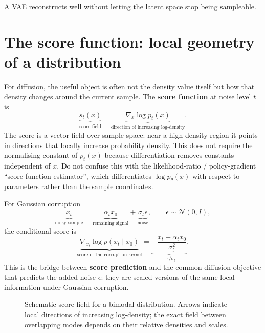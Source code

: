 \begin{calloutmemoryhook}
A VAE reconstructs well without letting the latent space stop being sampleable.
\end{calloutmemoryhook}

\section{The score function: local geometry of a distribution}

For diffusion, the useful object is often not the density value itself but how that density changes around the current sample.
The \textbf{score function} at noise level $t$ is
\[
\boxed{
\underbrace{s_t(x)}_{\text{score field}}
=
\underbrace{\nabla_x\log p_t(x)}_{\text{direction of increasing log-density}}
}.
\]
The score is a vector field over sample space: near a high-density region it points in directions that locally increase probability density.
This does not require the normalising constant of $p_t(x)$ because differentiation removes constants independent of $x$.
Do not confuse this with the likelihood-ratio / policy-gradient ``score-function estimator'', which differentiates $\log p_\theta(x)$ with respect to parameters rather than the sample coordinates.

For Gaussian corruption
\[
\underbrace{x_t}_{\text{noisy sample}}
=
\underbrace{\alpha_t x_0}_{\text{remaining signal}}
+
\underbrace{\sigma_t\epsilon}_{\text{noise}},
\qquad \epsilon\sim\mathcal N(0,I),
\]
the conditional score is
\[
\underbrace{\nabla_{x_t}\log p(x_t\mid x_0)}_{\text{score of the corruption kernel}}
=
\underbrace{-\frac{x_t-\alpha_t x_0}{\sigma_t^2}}_{-\epsilon/\sigma_t}.
\]
This is the bridge between \textbf{score prediction} and the common diffusion objective that predicts the added noise $\epsilon$: they are scaled versions of the same local information under Gaussian corruption.

\begin{figure}[H]
\centering
{}
\caption{Schematic score field for a bimodal distribution. Arrows indicate local directions of increasing log-density; the exact field between overlapping modes depends on their relative densities and scales.}
\label{fig:score-field}
\end{figure}

